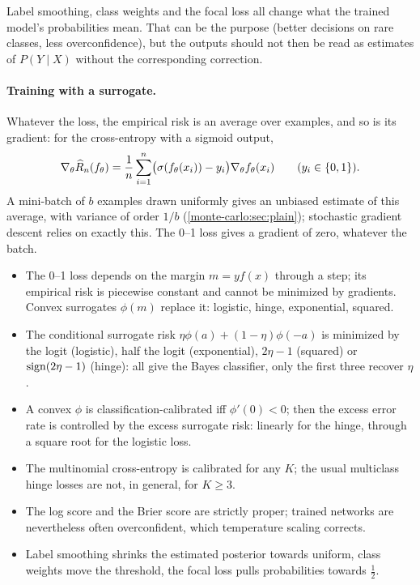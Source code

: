 \begin{notechapter}
\begin{pitfall}
Label smoothing, class weights and the focal loss all change what the trained
model's probabilities mean. That can be the purpose (better decisions on rare
classes, less overconfidence), but the outputs should not then be read as
estimates of $P(Y\mid X)$ without the corresponding correction.
\end{pitfall}

\paragraph{Training with a surrogate.} Whatever the loss, the empirical risk is an
average over examples, and so is its gradient: for the cross-entropy with a
sigmoid output,
\[
  \nabla_\theta\widehat{R}_n(f_\theta) = \frac1n\sum_{i=1}^n\bigl(\sigma(f_\theta(x_i)) - y_i\bigr)\nabla_\theta f_\theta(x_i)\qquad(y_i\in\{0,1\}).
\]
A mini-batch of $b$ examples drawn uniformly gives an unbiased estimate of this
average, with variance of order $1/b$ (\cref{monte-carlo:sec:plain}); stochastic gradient
descent relies on exactly this. The 0--1 loss gives a gradient of zero, whatever the
batch.

\begin{chaptersummary}
\begin{itemize}[nosep]
  \item The 0--1 loss depends on the margin $m = yf(x)$ through a step; its empirical risk
        is piecewise constant and cannot be minimized by gradients. Convex surrogates
        $\phi(m)$ replace it: logistic, hinge, exponential, squared.
  \item The conditional surrogate risk $\eta\phi(a) + (1 - \eta)\phi(-a)$ is minimized by the logit
        (logistic), half the logit (exponential), $2\eta - 1$ (squared) or $\operatorname{sign}(2\eta - 1)$ (hinge): all
        give the Bayes classifier, only the first three recover $\eta$.
  \item A convex $\phi$ is classification-calibrated iff $\phi'(0)<0$; then the excess error rate is
        controlled by the excess surrogate risk: linearly for the hinge, through a
        square root for the logistic loss.
  \item The multinomial cross-entropy is calibrated for any $K$; the usual multiclass hinge
        losses are not, in general, for $K\geq3$.
  \item The log score and the Brier score are strictly proper; trained networks are
        nevertheless often overconfident, which temperature scaling corrects.
  \item Label smoothing shrinks the estimated posterior towards uniform, class weights
        move the threshold, the focal loss pulls probabilities towards $\frac12$.
\end{itemize}
\end{chaptersummary}


\end{notechapter}
